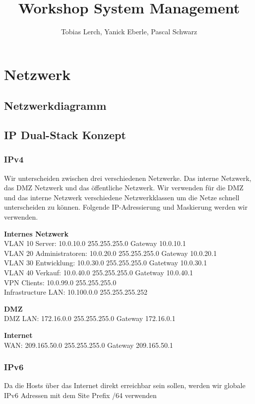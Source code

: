 \documentclass[11pt,a4paper,parskip=half]{scrartcl}
\title{Workshop System Management}
\author{Tobias Lerch, Yanick Eberle, Pascal Schwarz}
\begin{document}
\maketitle
\newpage

\section{Netzwerk}
\subsection{Netzwerkdiagramm}
\subsection{IP Dual-Stack Konzept}
\subsubsection{IPv4}
Wir unterscheiden zwischen drei verschiedenen Netzwerke. Das interne Netzwerk, das DMZ Netzwerk und das öffentliche Netzwerk. Wir verwenden für die DMZ und das interne Netzwerk verschiedene Netzwerkklassen um die Netze schnell unterscheiden zu können. Folgende IP-Adressierung und Maskierung werden wir verwenden.

\textbf{Internes Netzwerk}\\
VLAN 10 Server: 10.0.10.0 255.255.255.0 Gateway 10.0.10.1\\
VLAN 20 Administratoren: 10.0.20.0 255.255.255.0 Gateway 10.0.20.1\\
VLAN 30 Entwicklung: 10.0.30.0 255.255.255.0 Gatetway 10.0.30.1\\
VLAN 40 Verkauf: 10.0.40.0 255.255.255.0 Gatetway 10.0.40.1\\
VPN Clients: 10.0.99.0 255.255.255.0\\
Infrastructure LAN: 10.100.0.0 255.255.255.252

\textbf{DMZ}\\
DMZ LAN: 172.16.0.0 255.255.255.0 Gateway 172.16.0.1

\textbf{Internet}\\
WAN: 209.165.50.0 255.255.255.0 Gateway 209.165.50.1

\subsubsection{IPv6}
Da die Hosts über das Internet direkt erreichbar sein sollen, werden wir globale IPv6 Adressen mit dem Site Prefix /64 verwenden
\end{document}
